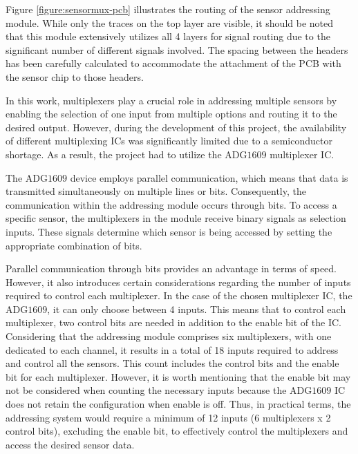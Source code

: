 Figure \ref{figure:sensormux-pcb} illustrates the routing of the sensor addressing module. While only the traces on the top layer are visible, it should be noted that this module extensively utilizes all 4 layers for signal routing due to the significant number of different signals involved. The spacing between the headers has been carefully calculated to accommodate the attachment of the \ac{PCB} with the sensor chip to those headers.


\noindent
In this work, multiplexers play a crucial role in addressing multiple sensors by enabling the selection of one input from multiple options and routing it to the desired output. However, during the development of this project, the availability of different multiplexing \ac{IC}s was significantly limited due to a semiconductor shortage. As a result, the project had to utilize the $\mathrm{ADG1609}$ multiplexer \ac{IC}.

The $\mathrm{ADG1609}$ device employs parallel communication, which means that data is transmitted simultaneously on multiple lines or bits. Consequently, the communication within the addressing module occurs through bits. To access a specific sensor, the multiplexers in the module receive binary signals as selection inputs. These signals determine which sensor is being accessed by setting the appropriate combination of bits.

Parallel communication through bits provides an advantage in terms of speed. However, it also introduces certain considerations regarding the number of inputs required to control each multiplexer. In the case of the chosen multiplexer \ac{IC}, the $\mathrm{ADG1609}$, it can only choose between 4 inputs. This means that to control each multiplexer, two control bits are needed in addition to the enable bit of the \ac{IC}. Considering that the addressing module comprises six multiplexers, with one dedicated to each channel, it results in a total of 18 inputs required to address and control all the sensors. This count includes the control bits and the enable bit for each multiplexer. However, it is worth mentioning that the enable bit may not be considered when counting the necessary inputs because the $\mathrm{ADG1609}$ \ac{IC} does not retain the configuration when enable is off. Thus, in practical terms, the addressing system would require a minimum of 12 inputs (6 multiplexers x 2 control bits), excluding the enable bit, to effectively control the multiplexers and access the desired sensor data.


